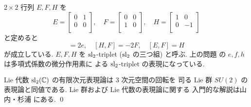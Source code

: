 \documentclass[12pt,twoside]{jarticle}
\begin{document}
\begin{guide}
  $2\times 2$ 行列 $E,F,H$ を
  \begin{equation*}
    E = 
    \begin{bmatrix}
      0 & 1 \\
      0 & 0 \\
    \end{bmatrix},
    \quad
    F = 
    \begin{bmatrix}
      0 & 0 \\
      1 & 0 \\
    \end{bmatrix},
    \quad
    H =
    \begin{bmatrix}
      1 & 0 \\
      0 & -1 \\
    \end{bmatrix}
  \end{equation*}
  と定めると
  \begin{equation*}
    [H,E]=2e, \quad [H,F]=-2F, \quad [E,F]=H
  \end{equation*}
  が成立している.  $E,F,H$ を $\mathrm{sl}_2$-triplet ($\mathrm{sl}_2$ の三つ組)
  と呼ぶ.  上の問題  の $e,f,h$ は多項式係数の微分作用素に
  よる $\mathrm{sl}_2$-triplet の表現になっている.
  
  Lie 代数 $\mathrm{sl}_2({\mathbb C})$ の有限次元表現論は $3$ 次元空間の回転を
  司る Lie 群 $SU(2)$ の表現論と同値である.
  Lie 群および Lie 代数の表現論に関する
  入門的な解説は山内・杉浦 \cite{renzokugunron} にある.
  \qed
\end{guide}
\end{document}
